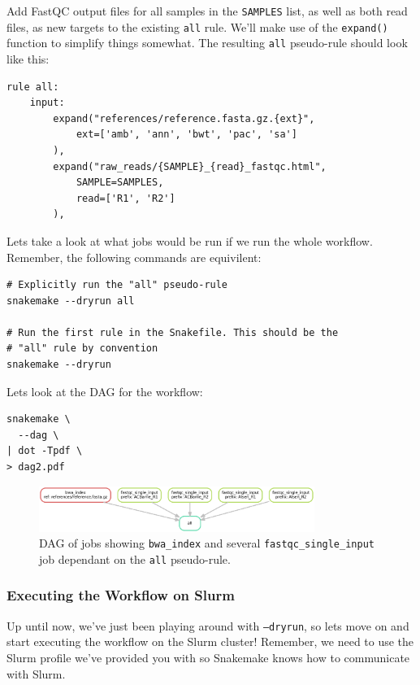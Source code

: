 Add FastQC output files for all samples in the \texttt{SAMPLES} list, as well as both read files, as new targets to the existing \texttt{all} rule. We'll make use of the \texttt{expand()}
function to simplify things somewhat. The resulting \texttt{all} pseudo-rule should look like this:

\begin{lstlisting}
rule all:
	input:
		expand("references/reference.fasta.gz.{ext}",
			ext=['amb', 'ann', 'bwt', 'pac', 'sa']
		),
		expand("raw_reads/{SAMPLE}_{read}_fastqc.html",
			SAMPLE=SAMPLES,
			read=['R1', 'R2']
		),
\end{lstlisting}

Lets take a look at what jobs would be run if we run the whole workflow. Remember, the following commands are equivilent:

\begin{lstlisting}
# Explicitly run the "all" pseudo-rule
snakemake --dryrun all

# Run the first rule in the Snakefile. This should be the
# "all" rule by convention
snakemake --dryrun
\end{lstlisting}

Lets look at the DAG for the workflow:

\begin{lstlisting}
snakemake \
  --dag \
| dot -Tpdf \
> dag2.pdf
\end{lstlisting}

\begin{figure}[H]
\centering
\includegraphics[width=0.8\textwidth]{handout/dag2.pdf}
\caption{DAG of jobs showing \texttt{bwa\_index} and several \texttt{fastqc\_single\_input} job dependant on the \texttt{all} pseudo-rule.}
\label{fig:dag2}
\end{figure}


\subsubsection{Executing the Workflow on Slurm}

Up until now, we've just been playing around with \texttt{--dryrun}, so lets move on and start executing the workflow on the Slurm cluster!
Remember, we need to use the Slurm profile we've provided you with so Snakemake knows how to communicate with Slurm.

